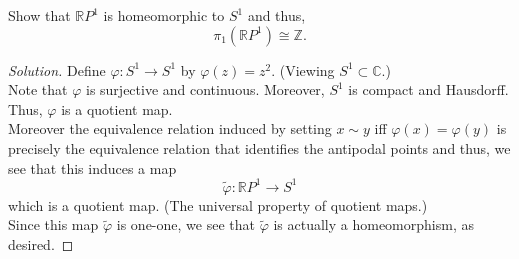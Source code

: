\documentclass[12pt]{article}
\newenvironment{soln}{\begin{proof}[Solution]}{\end{proof}}
\begin{document}
\begin{exe} \label{exe:RP1isS1}
	Show that $\mathbb{R}P^1$ is homeomorphic to $S^1$ and thus, 
	\begin{equation*} 
		\pi_1(\mathbb{R}P^1) \cong \mathbb{Z}.
	\end{equation*}
\end{exe}
\begin{soln}
	Define $\varphi:S^1 \to S^1$ by $\varphi(z) = z^2.$ (Viewing $S^1 \subset \mathbb{C}.$) \\
	Note that $\varphi$ is surjective and continuous. Moreover, $S^1$ is compact and Hausdorff. Thus, $\varphi$ is a quotient map. \\
	Moreover the equivalence relation induced by setting $x \sim y$ iff $\varphi(x) = \varphi(y)$ is precisely the equivalence relation that identifies the antipodal points and thus, we see that this induces a map
	\begin{equation*} 
		\tilde{\varphi}:\mathbb{R}P^1 \to S^1
	\end{equation*}
	which is a quotient map. (The universal property of quotient maps.)\\
	Since this map $\tilde{\varphi}$ is one-one, we see that $\tilde{\varphi}$ is actually a homeomorphism, as desired.
\end{soln}
\end{document}
